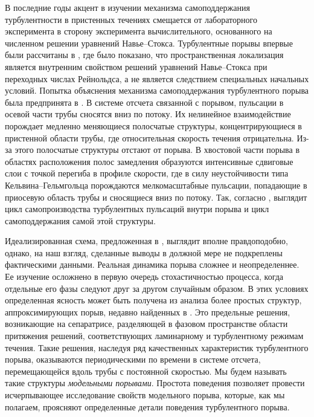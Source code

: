 В последние годы акцент в изучении механизма самоподдержания турбулентности в пристенных течениях смещается от лабораторного эксперимента в сторону эксперимента вычислительного, основанного на численном решении уравнений Навье--Стокса. Турбулентные порывы впервые были рассчитаны в \cite{Priymak2004}, где было показано, что пространственная локализация является внутренним свойством решений уравнений Навье--Стокса при переходных числах Рейнольдса, а не является следствием специальных начальных условий. Попытка объяснения механизма самоподдержания турбулентного порыва была предпринята в \cite{Shimizu2009}. В системе отсчета связанной с порывом, пульсации в осевой части трубы сносятся вниз по потоку. Их нелинейное взаимодействие порождает медленно меняющиеся полосчатые структуры, концентрирующиеся в пристенной области трубы, где относительная скорость течения отрицательна. Из-за этого полосчатые структуры отстают от порыва. В хвостовой части порыва в областях расположения полос замедления образуются интенсивные сдвиговые слои с точкой перегиба в профиле скорости, где в силу неустойчивости типа Кельвина--Гельмгольца порождаются мелкомасштабные пульсации, попадающие в приосевую область трубы и сносящиеся вниз по потоку. Так, согласно \cite{Shimizu2009}, выглядит цикл самопроизводства турбулентных пульсаций внутри порыва и цикл самоподдержания самой этой структуры.

Идеализированная схема, предложенная в \cite{Shimizu2009}, выглядит вполне правдоподобно, однако, на наш взгляд, сделанные выводы в должной мере не подкреплены фактическими данными. Реальная динамика порыва сложнее и неопределеннее. Ее изучение осложнено в первую очередь стохастичностью процесса, когда отдельные его фазы следуют друг за другом случайным образом. В этих условиях определенная ясность может быть получена из анализа более простых структур, аппроксимирующих порыв, недавно найденных в \cite{Skufca2006, Avila2013}. Это предельные решения, возникающие на сепаратрисе, разделяющей в фазовом пространстве области притяжения решений, соответствующих ламинарному и турбулентному режимам течения. Такие решения, наследуя ряд качественных характеристик турбулентного порыва, оказываются периодическими по времени в системе отсчета, перемещающейся вдоль трубы с постоянной скоростью. Мы будем называть такие структуры {\it модельными порывами}. Простота поведения позволяет провести исчерпывающее исследование свойств модельного порыва, которые, как мы полагаем, проясняют определенные детали поведения турбулентного порыва. 


